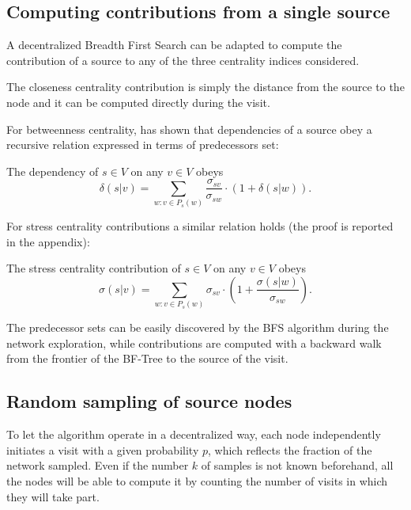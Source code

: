 \subsection{Computing contributions from a single source}
\label{sec:recursive}

A decentralized Breadth First Search can be adapted to compute the contribution of a source to any of the three centrality indices considered.

The closeness centrality contribution is simply the distance from the source to the node and it can be computed directly during the visit.

For betweenness centrality, \citet{brandes2001} has shown that dependencies of a source obey a recursive relation expressed in terms of predecessors set:
\begin{theorem}[Brandes, 2001]
\label{th:contrib:bc}
The dependency of $s \in V$ on any $v \in V$ obeys
\begin{equation} \label{eq:th:contrib:bc}
\delta(s|v) = \sum_{w : v \in P_s(w)} \frac{\sigma_{sv}}{\sigma_{sw}} \cdot (1 + \delta(s|w)) .
\end{equation}
\end{theorem}
For stress centrality contributions a similar relation holds (the proof is reported in the appendix):
\begin{theorem}
\label{th:contrib:sc}
The stress centrality contribution of $s \in V$ on any $v \in V$ obeys
\begin{equation} \label{eq:th:contrib:sc}
\sigma(s|v) = \sum_{w : v \in P_s(w)} \sigma_{sv} \cdot \left( 1 + \frac{\sigma(s|w)}{\sigma_{sw}} \right) .
\end{equation}
\end{theorem}

The predecessor sets can be easily discovered by the BFS algorithm during the network exploration, while contributions are computed with a backward walk from the frontier of the BF-Tree to the source of the visit.

\subsection{Random sampling of source nodes}

To let the algorithm operate in a decentralized way, each node independently initiates a visit with a given probability $p$, which reflects the fraction of the network sampled. Even if the number $k$ of samples is not known beforehand, all the nodes will be able to compute it by counting the number of visits in which they will take part.

